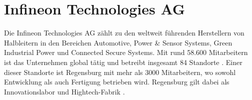 \section{Infineon Technologies AG}

Die Infineon Technologies AG zählt zu den weltweit führenden Herstellern von Halbleitern in den Bereichen Automotive, Power \& Sensor Systems, Green Industrial Power und Connected Secure Systems. Mit rund 58.600 Mitarbeitern ist das Unternehmen global tätig und betreibt insgesamt 84 Standorte \cite{infineon2024unternehmenspraesentation}. Einer dieser Standorte ist Regensburg mit mehr als 3000 Mitarbeitern, wo sowohl Entwicklung als auch Fertigung betrieben wird. Regensburg gilt dabei als Innovationslabor und Hightech-Fabrik \cite{infineon2024regensburg}.
